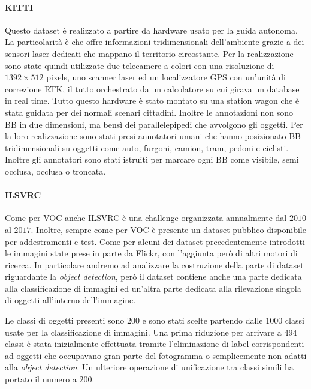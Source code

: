 \paragraph{KITTI}  \cite{geiger2012we} Questo dataset è realizzato a partire da hardware usato per la guida autonoma. La particolarità è che offre informazioni tridimensionali dell'ambiente grazie a dei sensori laser dedicati che mappano il territorio circostante. Per la realizzazione sono state quindi utilizzate due telecamere a colori con una risoluzione di $1392 \times 512$ pixels, uno scanner laser ed un localizzatore GPS con un'unità di correzione RTK, il tutto orchestrato da un calcolatore su cui girava un database in real time.  Tutto questo hardware è stato montato su una station wagon che è stata guidata per dei normali scenari cittadini. 
Inoltre le annotazioni non sono \ac{BB} in due dimensioni, ma bensì dei parallelepipedi che avvolgono gli oggetti. Per la loro realizzazione sono stati presi annotatori umani che hanno posizionato \ac{BB} tridimensionali su oggetti come auto, furgoni, camion, tram, pedoni e ciclisti. Inoltre gli annotatori sono stati istruiti per marcare ogni \ac{BB} come visibile, semi occlusa, occlusa o troncata. 



\paragraph{ILSVRC}
Come per \ac{VOC} anche \ac{ILSVRC} \cite{russakovsky2015imagenet} è una challenge organizzata annualmente dal $2010$ al $2017$. Inoltre, sempre come per \ac{VOC} è presente un dataset pubblico disponibile per addestramenti e test. 
Come per alcuni dei dataset precedentemente introdotti le immagini state prese in parte da Flickr, con l'aggiunta però di altri motori di ricerca. In particolare andremo ad analizzare la costruzione della parte di dataset riguardante la \textit{object detection}, però il dataset contiene anche una parte dedicata alla classificazione di immagini ed un'altra parte dedicata alla rilevazione singola di oggetti all'interno dell'immagine. 

Le classi di oggetti presenti sono $200$ e sono stati scelte partendo dalle $1000$ classi usate per la classificazione di immagini. Una prima riduzione per arrivare a $494$ classi è stata inizialmente effettuata tramite l'eliminazione di label corrispondenti ad oggetti che occupavano gran parte del fotogramma o semplicemente non adatti alla \textit{object detection}. Un ulteriore operazione di unificazione tra classi simili ha portato il numero a $200$. 

